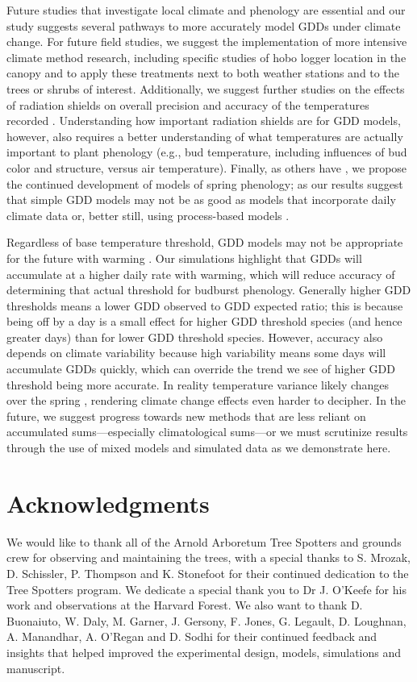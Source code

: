 \documentclass{article}\usepackage[]{graphicx}\usepackage[]{color}
\begin{document}
Future studies that investigate local climate and phenology are essential and our study suggests several pathways to more accurately model GDDs under climate change. For future field studies, we suggest the implementation of more intensive climate method research, including specific studies of hobo logger location in the canopy and to apply these treatments next to both weather stations and to the trees or shrubs of interest. Additionally, we suggest further studies on the effects of radiation shields on overall precision and accuracy of the temperatures recorded \citep{daCunha2015}. Understanding how important radiation shields are for GDD models, however, also requires a better understanding of what temperatures are actually important to plant phenology (e.g., bud temperature, including influences of bud color and structure, versus air temperature). Finally, as others have \citep{Chuine2016, Duputie2015}, we propose the continued development of models of spring phenology; as our results suggest that simple GDD models may not be as good as models that incorporate daily climate data or, better still, using process-based models \citep{Keenan2019}. 
 
Regardless of base temperature threshold, GDD models may not be appropriate for the future with warming \citep{Man2010}. Our simulations highlight that GDDs will accumulate at a higher daily rate with warming, which will reduce accuracy of determining that actual threshold for budburst phenology. Generally higher GDD thresholds means a lower GDD observed to GDD expected ratio; this is because being off by a day is a small effect for higher GDD threshold species (and hence greater days) than for lower GDD threshold species. However, accuracy also depends on climate variability because high variability means some days will accumulate GDDs quickly, which can override the trend we see of higher GDD threshold being more accurate. In reality temperature variance likely changes over the spring \citep{Qu2014}, rendering climate change effects even harder to decipher. In the future, we suggest progress towards new methods that are less reliant on accumulated sums---especially climatological sums---or we must scrutinize results through the use of mixed models and simulated data as we demonstrate here.

\section*{Acknowledgments}
We would like to thank all of the Arnold Arboretum Tree Spotters and grounds crew for observing and maintaining the trees, with a special thanks to S. Mrozak, D. Schissler, P. Thompson and K. Stonefoot for their continued dedication to the Tree Spotters program. We dedicate a special thank you to Dr J. O'Keefe for his work and observations at the Harvard Forest. We also want to thank D. Buonaiuto, W. Daly, M. Garner, J. Gersony, F. Jones, G. Legault, D. Loughnan, A. Manandhar, A. O'Regan and D. Sodhi for their continued feedback and insights that helped improved the experimental design, models, simulations and manuscript. 
\end{document}
